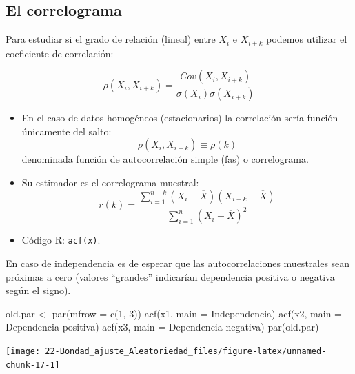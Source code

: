 \documentclass[
]{book}
\newenvironment{Shaded}{\begin{snugshade}}{\end{snugshade}}
\newcommand{\AttributeTok}[1]{\textcolor[rgb]{0.77,0.63,0.00}{#1}}
\newcommand{\DecValTok}[1]{\textcolor[rgb]{0.00,0.00,0.81}{#1}}
\newcommand{\FunctionTok}[1]{\textcolor[rgb]{0.00,0.00,0.00}{#1}}
\newcommand{\NormalTok}[1]{#1}
\newcommand{\OtherTok}[1]{\textcolor[rgb]{0.56,0.35,0.01}{#1}}
\newcommand{\StringTok}[1]{\textcolor[rgb]{0.31,0.60,0.02}{#1}}
\theoremstyle{break}
\theoremstyle{nonumberplain}
\begin{document}
\hypertarget{el-correlograma}{%
\subsection{El correlograma}\label{el-correlograma}}

Para estudiar si el grado de relación (lineal) entre \(X_{i}\) e
\(X_{i+k}\) podemos utilizar el coeficiente de correlación:

\[\rho\left(  X_{i},X_{i+k}\right) = \frac{Cov\left(  X_{i},X_{i+k}\right)    }
{\sigma\left(  X_{i}\right)  \sigma\left(  X_{i+k}\right)  }\]

\begin{itemize}
\item
  En el caso de datos homogéneos (estacionarios) la correlación sería función únicamente del salto:
  \[\rho\left(  X_{i},X_{i+k}\right)  \equiv\rho\left(  k\right)\]
  denominada función de autocorrelación simple (fas) o correlograma.
\item
  Su estimador es el correlograma muestral:
  \[r(k)=\frac{\sum_{i=1}^{n-k}(X_{i}-\overline{X})(X_{i+k}-\overline{X})}
  {\sum_{i=1}^{n}(X_{i}-\overline{X})^{2}}\]
\item
  Código R: \texttt{acf(x)}.
\end{itemize}

En caso de independencia es de esperar que las autocorrelaciones
muestrales sean próximas a cero (valores ``grandes'' indicarían
dependencia positiva o negativa según el signo).

\begin{Shaded}
\begin{Highlighting}[]
\NormalTok{old.par }\OtherTok{\textless{}{-}} \FunctionTok{par}\NormalTok{(}\AttributeTok{mfrow =} \FunctionTok{c}\NormalTok{(}\DecValTok{1}\NormalTok{, }\DecValTok{3}\NormalTok{))}
\FunctionTok{acf}\NormalTok{(x1, }\AttributeTok{main =} \StringTok{\textquotesingle{}Independencia\textquotesingle{}}\NormalTok{)}
\FunctionTok{acf}\NormalTok{(x2, }\AttributeTok{main =} \StringTok{\textquotesingle{}Dependencia positiva\textquotesingle{}}\NormalTok{)}
\FunctionTok{acf}\NormalTok{(x3, }\AttributeTok{main =} \StringTok{\textquotesingle{}Dependencia negativa\textquotesingle{}}\NormalTok{)}
\FunctionTok{par}\NormalTok{(old.par)}
\end{Highlighting}
\end{Shaded}

\begin{center}\texttt{[image: 22-Bondad\_ajuste\_Aleatoriedad\_files/figure-latex/unnamed-chunk-17-1]} \end{center}
\end{document}
